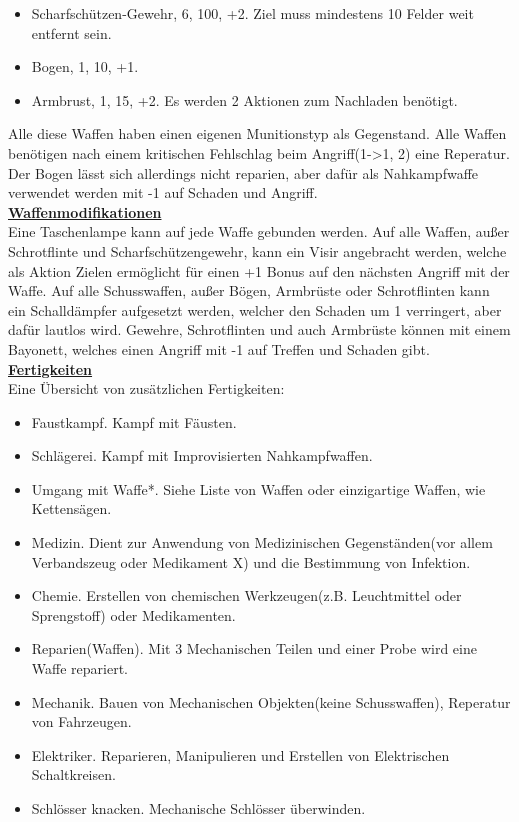 \documentclass[twoside,a4paper]{minimal}
\begin{document}
\begin{multicols*}{3}
\begin{itemize}
\item Scharfschützen-Gewehr, 6, 100, +2. Ziel muss mindestens 10 Felder weit entfernt sein. 
\item Bogen, 1, 10, +1.
\item Armbrust, 1, 15, +2. Es werden 2 Aktionen zum Nachladen benötigt.
\end{itemize}
Alle diese Waffen haben einen eigenen Munitionstyp als Gegenstand. Alle Waffen benötigen nach einem kritischen Fehlschlag beim Angriff(1->1, 2) eine Reperatur. Der Bogen lässt sich allerdings nicht reparien, aber dafür als Nahkampfwaffe verwendet werden mit -1 auf Schaden und Angriff.
\textbf{\uline{\\Waffenmodifikationen}}
\\Eine Taschenlampe kann auf jede Waffe gebunden werden. Auf alle Waffen, außer Schrotflinte und Scharfschützengewehr, kann ein Visir angebracht werden, welche als Aktion Zielen ermöglicht für einen +1 Bonus auf den nächsten Angriff mit der Waffe. Auf alle Schusswaffen, außer Bögen, Armbrüste oder Schrotflinten kann ein Schalldämpfer aufgesetzt werden, welcher den Schaden um 1 verringert, aber dafür lautlos wird. Gewehre, Schrotflinten und auch Armbrüste können mit einem Bayonett, welches einen Angriff mit -1 auf Treffen und Schaden gibt.
\textbf{\uline{\\Fertigkeiten}}
\\Eine Übersicht von zusätzlichen Fertigkeiten:
\begin{itemize}
\item Faustkampf. Kampf mit Fäusten.
\item Schlägerei. Kampf mit Improvisierten Nahkampfwaffen.
\item Umgang mit Waffe*. Siehe Liste von Waffen oder einzigartige Waffen, wie Kettensägen.
\item Medizin. Dient zur Anwendung von Medizinischen Gegenständen(vor allem Verbandszeug oder Medikament X) und die Bestimmung von Infektion.
\item Chemie. Erstellen von chemischen Werkzeugen(z.B. Leuchtmittel oder Sprengstoff) oder Medikamenten.
\item Reparien(Waffen). Mit 3 Mechanischen Teilen und einer Probe wird eine Waffe repariert.
\item Mechanik. Bauen von Mechanischen Objekten(keine Schusswaffen), Reperatur von Fahrzeugen.
\item Elektriker. Reparieren, Manipulieren und Erstellen von Elektrischen Schaltkreisen.
\item Schlösser knacken. Mechanische Schlösser überwinden.

\end{itemize}
\end{multicols*}
\end{document}
